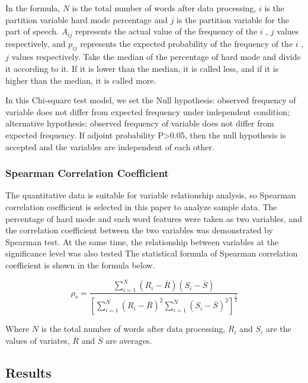 \documentclass[
  journal=medium,
  manuscript=Report,
  year=2023,
  volume=37,
]{cup-journal}
\begin{document}
In the formula, $N$ is the total number of words after data processing, $i$ is the partition variable hard mode percentage and $j$ is the partition variable for the part of speech. $A_{ij}$ represents the actual value of the frequency of the $i$ , $j$ values respectively, and $p_{ij}$ represents the expected probability of the frequency of the $i$ , $j$ values respectively. Take the median of the percentage of hard mode and divide it according to it. If it is lower than the median, it is called less, and if it is higher than the median, it is called more. 

In this Chi-square test model, we set the Null hypothesis: observed frequency of variable does not differ from expected frequency under independent condition; alternative hypothesis: observed frequency of variable does not differ from expected frequency. If adjoint probability P>0.05, then the null hypothesis is accepted and the variables are independent of each other. 

\subsubsection{Spearman Correlation Coefficient}

The quantitative data is suitable for variable relationship analysis, so Spearman correlation coefficient is selected in this paper to analyze sample data. The percentage of hard mode and each word features were taken as two variables, and the correlation coefficient between the two variables was demonstrated by Spearman test. At the same time, the relationship between variables at the significance level was also tested The statistical formula of Spearman correlation coefficient is shown in the formula below.

$$\rho_s = \frac{\sum^N_{i=1}(R_i - \overline{R})(S_i - \overline{S})}{[\sum^N_{i=1}(R_i - \overline{R})^2\sum^N_{i=1}(S_i - \overline{S})^2]^{\frac{1}{2}}}$$

Where $N$ is the total number of words after data processing, $R_i$ and $S_i$ are the values of variates, $\overline{R}$ and $\overline{S}$ are averages. 

\subsection{Results}
\end{document}
